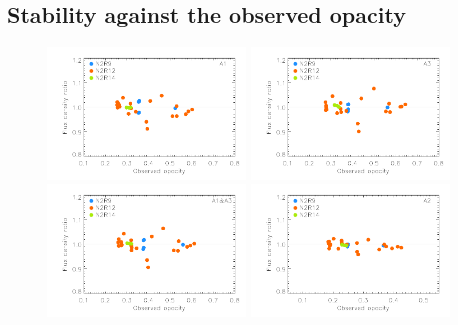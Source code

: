 \subsection{Stability against the observed opacity}


\begin{figure}[ht!]
\begin{center}
\includegraphics[clip=true,width=0.47\textwidth]{Figures/Calibration/plot_flux_density_ratio_obstau_primary_a1.pdf}
\includegraphics[clip=true,width=0.47\textwidth]{Figures/Calibration/plot_flux_density_ratio_obstau_primary_a3.pdf}
\includegraphics[clip=true,width=0.47\textwidth]{Figures/Calibration/plot_flux_density_ratio_obstau_primary_1mm.pdf}
\includegraphics[clip=true,width=0.47\textwidth]{Figures/Calibration/plot_flux_density_ratio_obstau_primary_a2.pdf}

\end{center}
\end{figure}
